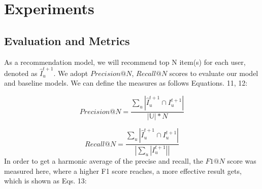\documentclass[runningheads]{llncs}
\begin{document}



\section{Experiments}

\subsection{Evaluation and Metrics}

As a recommendation model, we will recommend top N item(s) for each user, denoted as $\hat{I}_{u}^{t+1}$. We adopt $Precision@N$, $Recall@N$ scores to evaluate our model and baseline models. We can define the measures as follows Equations. 11, 12:

\begin{equation}
Precision@N=\frac{\sum_{u}|\hat{I}_{u}^{t+1}\cap I_{u}^{t+1} |}{\left | \mathbb{U} \right |*N}
\end{equation}

\begin{equation}
Recall@N=\frac{\sum_{u}|\hat{I}_{u}^{t+1}\cap I_{u}^{t+1} |}{\left |\sum_{u}|I_{u}^{t+1}| \right |}
\end{equation}
In order to get a harmonic average of the precise and recall, the $F1@N$ score was measured here, where a higher F1 score reaches, a more effective result gets, which is shown as Eqs. 13:
\end{document}

